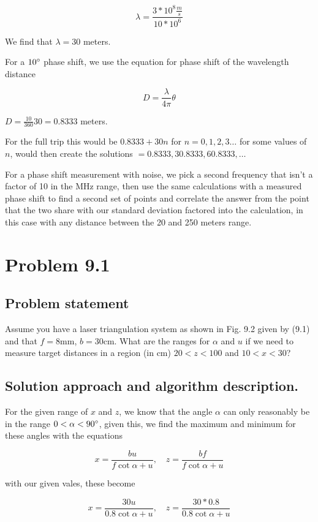 \documentclass[letterpaper,11pt]{texMemo} %
\begin{document}
\[
    \lambda = \frac{3*10^8 \frac{m}{s}}{10*10^6}
\]

We find that $\lambda = 30$ meters.

For a $10\degree$ phase shift, we use the equation for phase shift of the wavelength distance

\[
    D = \frac{\lambda}{4\pi} \theta
\]

$D = \frac{10}{360}30 = 0.8333$ meters.

For the full trip this would be $0.8333 + 30n$ for $n = 0,1,2,3\dots$
for some values of $n$, would then create the solutions $=0.8333, 30.8333, 60.8333,\dots$

For a phase shift measurement with noise, we pick a second frequency that isn't a factor of 
10 in the MHz range, then use the same calculations with a measured phase shift to find a second
set of points and correlate the answer from the point that the two share with our standard deviation 
factored into the calculation, in this case with any distance between the 20 and 250 meters 
range.


\newpage
\section*{Problem 9.1}
\subsection*{Problem statement}
Assume you have a laser triangulation system as shown in Fig. 9.2 given by (9.1) and that $f  = 8$mm,
$b=30$cm. What are the ranges for $\alpha$ and $u$ if we need to measure target distances in a region
(in cm) $20 < z < 100$ and $10<x<30$?

\subsection*{Solution approach and algorithm description.}

For the given range of $x$ and $z$, we know that the angle $\alpha$ can only reasonably be in the range
$0<\alpha<90\degree$, given this, we find the maximum and minimum for these angles with the equations

\[
    x = \frac{b u}{f\cot \alpha + u},  \quad
z = \frac{b f}{f\cot \alpha + u}
\]

with our given vales, these become

\[
    x = \frac{30 u}{0.8\cot \alpha + u},  \quad
z = \frac{30 * 0.8}{0.8\cot \alpha + u}
\]
\end{document}
